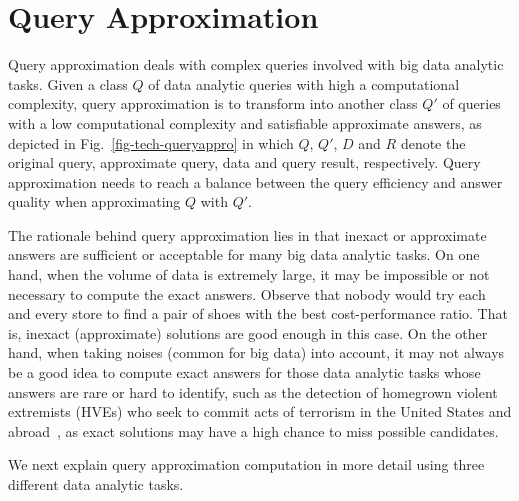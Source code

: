 \section{Query Approximation}
\label{sec-query}


Query approximation deals with complex queries involved with big data analytic tasks. Given a class $Q$ of data analytic queries with high a computational complexity,  query approximation is to transform into another class $Q'$ of queries with a low computational complexity and satisfiable approximate answers, as depicted in Fig.~\ref{fig-tech-queryappro} in which $Q$, $Q'$,  $D$ and $R$ denote the original query, approximate query, data and query result, respectively. Query approximation needs to reach a balance between the query efficiency and answer quality when approximating $Q$ with $Q'$.

The rationale behind query approximation lies in that inexact or approximate answers are sufficient or acceptable for many big data analytic tasks.
On one hand, when the volume of data is extremely large, it may be impossible or not necessary to compute the exact answers.
Observe that nobody would try each and every store to find a pair of shoes with the best cost-performance ratio.
That is, inexact (approximate) solutions are good enough in this case.
%
On the other hand, when taking noises (common for big data) into account, it may not always be a good idea to compute exact answers
for those data analytic tasks whose answers are rare or hard to identify, such as the detection of homegrown violent extremists (HVEs) who seek to commit acts of terrorism in the United States and abroad~\cite{HungJ16}, as exact solutions may have a high chance to miss possible candidates.

We next explain query approximation computation in more detail using three different data analytic tasks.



